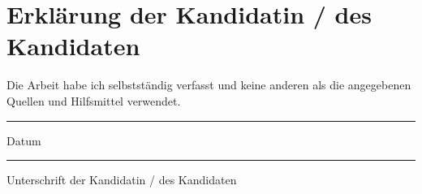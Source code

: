 \chapter{Erklärung der Kandidatin / des Kandidaten}

\begin{description}[$\Box$~]
\item[$\Box$] Die Arbeit habe ich selbstständig verfasst und keine anderen als die angegebenen Quellen und Hilfsmittel verwendet.\\
\end{description}

\vspace{2cm}

\begin{minipage}[t]{3cm}
\rule{3cm}{0.5pt}
Datum
\end{minipage}
\hfill
\begin{minipage}[t]{9cm}
\rule{9cm}{0.5pt}
Unterschrift der Kandidatin / des Kandidaten
\end{minipage}